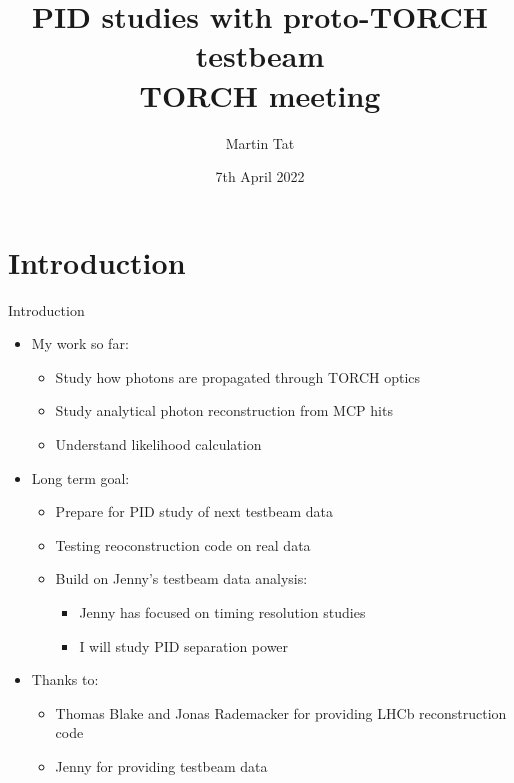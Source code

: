 \documentclass{beamer}
\title[TORCH meeting]{PID studies with proto-TORCH testbeam \\TORCH meeting}
\author{Martin Tat}
\institute{University of Oxford}
\date{7th April 2022}
\begin{document}
\begin{frame}
  \titlepage
\end{frame}


\section{Introduction}
\begin{frame}{Introduction}
  \begin{itemize}
    \setlength\itemsep{1.0em}
    \item{My work so far:}
    \begin{itemize}
    \setlength\itemsep{0.5em}
      \item{Study how photons are propagated through TORCH optics}
      \item{Study analytical photon reconstruction from MCP hits}
      \item{Understand likelihood calculation}
    \end{itemize}
    \item{Long term goal:}
    \begin{itemize}
    \setlength\itemsep{0.5em}
      \item{Prepare for PID study of next testbeam data}
      \item{Testing reoconstruction code on real data}
      \item{Build on Jenny's testbeam data analysis:}
      \begin{itemize}
        \item{Jenny has focused on timing resolution studies}
        \item{I will study PID separation power}
      \end{itemize}
    \end{itemize}
    \item{Thanks to:}
    \begin{itemize}
      \item{Thomas Blake and Jonas Rademacker for providing LHCb reconstruction code}
      \item{Jenny for providing testbeam data}
    \end{itemize}
  \end{itemize}
\end{frame}
\end{document}
